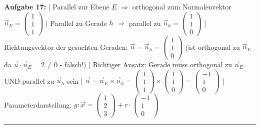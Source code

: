\documentclass[12pt,a4paper]{article}
\newcommand{\vek}[1]{\vec{#1}}
\begin{document}
\textbf{Aufgabe 17:} |
Parallel zur Ebene $E$ $\Rightarrow$ orthogonal zum Normalenvektor $\vek{n}_E = \begin{pmatrix}1\\1\\1\end{pmatrix}$ |
Parallel zu Gerade $h$ $\Rightarrow$ parallel zu $\vek{u}_h = \begin{pmatrix}1\\1\\0\end{pmatrix}$ |
Richtungsvektor der gesuchten Geraden: $\vek{u} = \vek{u}_h = \begin{pmatrix}1\\1\\0\end{pmatrix}$ (ist orthogonal zu $\vek{n}_E$ da $\vek{u} \cdot \vek{n}_E = 2 \neq 0$ - falsch!) |
Richtiger Ansatz: Gerade muss orthogonal zu $\vek{n}_E$ UND parallel zu $\vek{u}_h$ sein |
$\vek{u} = \vek{n}_E \times \vek{u}_h = \begin{pmatrix}1\\1\\1\end{pmatrix} \times \begin{pmatrix}1\\1\\0\end{pmatrix} = \begin{pmatrix}-1\\1\\0\end{pmatrix}$ |
Parameterdarstellung: $g: \vek{x} = \begin{pmatrix}1\\2\\3\end{pmatrix} + r \cdot \begin{pmatrix}-1\\1\\0\end{pmatrix}$
\begin{center}\rule{0.8\linewidth}{0.4pt}\end{center}
\end{document}

